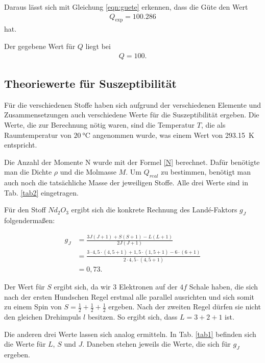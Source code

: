 \noindent Daraus lässt sich mit Gleichung \eqref{eqn:guete} erkennen, dass die Güte den Wert 
\begin{align*} 
    Q_\text{exp} = \num{100.286}
\end{align*}
hat. 

\noindent Der gegebene Wert für $Q$ liegt bei 
\begin{align*} 
    Q = \num{100}.
\end{align*}


\subsection{Theoriewerte für Suszeptibilität} 
Für die verschiedenen Stoffe haben sich aufgrund der verschiedenen Elemente und Zusammensetzungen auch verschiedene 
Werte für die Suszeptibilität ergeben. 
Die Werte, die zur Berechnung nötig waren, sind die Temperatur $T$, die als Raumtemperatur von $\SI{20}{\celsius}$ angenommen wurde, was einem Wert von \SI{293.15}{\kelvin} entspricht. 

\noindent Die Anzahl der Momente N wurde mit der Formel \eqref{N} berechnet. Dafür benötigte man die Dichte $\rho$ und die Molmasse $M$. Um $Q_{real}$ zu bestimmen, benötigt man auch noch die tatsächliche Masse der jeweiligen Stoffe. Alle drei Werte sind in Tab. \ref{tab2} eingetragen. 



\noindent Für den Stoff $Nd_2 O_3$ ergibt sich die konkrete Rechnung des Landé-Faktors $g_J$ folgendermaßen: 

\begin{align*}
    g_J &= \frac{3 J (J+1) + S (S+1) - L (L+1)}{2 J (J+1)} \\
        &= \frac{3 \cdot 4,5 \cdot(4,5 + 1) + 1,5 \cdot (1,5 +1) - 6 \cdot (6+1)}{2 \cdot 4,5 \cdot (4,5 + 1)} \\
        &= 0,73.
\end{align*} 

\noindent Der Wert für $S$ ergibt sich, da wir \num{3} Elektronen auf der $4f$ Schale haben, die sich nach der ersten Hundschen Regel erstmal alle parallel ausrichten und sich somit zu einem Spin von $S = \frac{1}{2}+ \frac{1}{2} + \frac{1}{2}$ ergeben. Nach der zweiten Regel dürfen sie nicht den gleichen Drehimpuls $l$ besitzen. So ergibt sich, dass $L = 3 + 2 + 1$ ist. 

\noindent Die anderen drei Werte lassen sich analog ermitteln. 
In Tab. \ref{tab1} befinden sich die Werte für $L$, $S$ und $J$. Daneben stehen jeweils die Werte, die sich für 
$g_J$ ergeben. 

